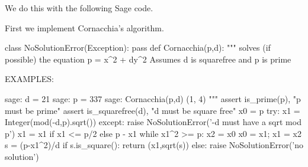 \documentclass[11pt]{article}
\begin{document}
We do this with the following Sage code.

First we implement Cornacchia's algorithm.
\begin{sagecode}
\begin{sagecell}
class NoSolutionError(Exception):
    pass
def Cornacchia(p,d):
    """
        solves (if possible) the equation
    p = x^2 + dy^2
        Assumes d is squarefree and p is prime

        EXAMPLES:

            sage: d = 21
            sage: p = 337 
            sage: Cornacchia(p,d)
            (1, 4)
    """
    assert is_prime(p), "p must be prime"
    assert is_squarefree(d), "d must be square free"
    x0 = p
    try:
        x1 = Integer(mod(-d,p).sqrt())
    except:
        raise NoSolutionError('-d must have a sqrt mod p')
    x1 = x1 if x1 <= p/2 else p - x1
    while x1^2 >= p:
        x2 = x0%
        x0 = x1; x1 = x2
    s = (p-x1^2)/d
    if s.is_square():
        return (x1,sqrt(s))
    else:
        raise NoSolutionError('no solution')
\end{sagecell}
\end{sagecode}
\end{document}
